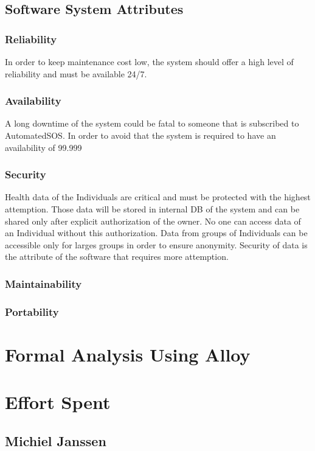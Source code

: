 \documentclass[12pt]{article}
\begin{document}
\subsection{Software System Attributes}
\subsubsection{Reliability}
In order to keep maintenance cost low, the system should offer a high level of reliability and must be available 24/7.

\subsubsection{Availability}
A long downtime of the system could be fatal to someone that is subscribed to AutomatedSOS. In order to avoid that the system is required to have an availability of 99.999%
\subsubsection{Security}
Health data of the Individuals are critical and must be protected with the highest attemption. Those data will be stored in internal DB of the system and can be shared only after explicit authorization of the owner. No one can access data of an Individual without this authorization. Data from groups of Individuals can be accessible only for larges groups in order to ensure anonymity. Security of data is the attribute of the software that requires more attemption. 
\subsubsection{Maintainability}

\subsubsection{Portability}

\section{Formal Analysis Using Alloy}

\newpage
\section{Effort Spent}
\subsection{Michiel Janssen}
\end{document}
